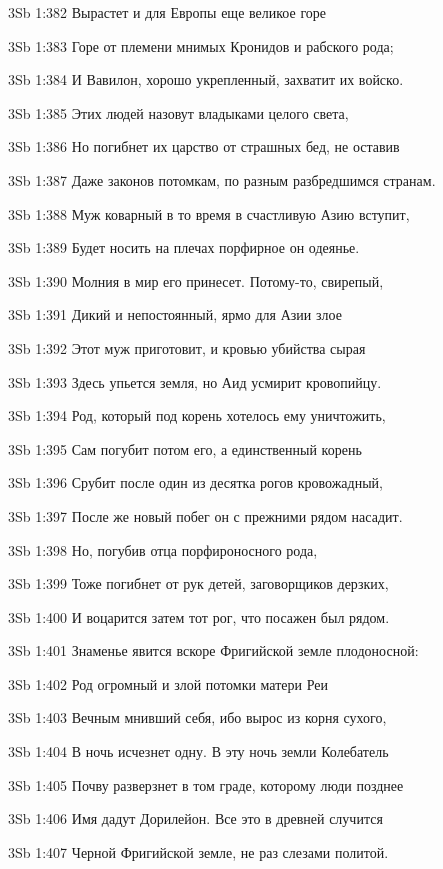 \vs 3Sb 1:382 Вырастет и для Европы еще великое горе  

\vs 3Sb 1:383 Горе от племени мнимых Кронидов и рабского рода; 

\vs 3Sb 1:384 И Вавилон, хорошо укрепленный, захватит их войско.

\vs 3Sb 1:385 Этих людей назовут владыками целого света,

\vs 3Sb 1:386 Но погибнет их царство от страшных бед, не оставив 

\vs 3Sb 1:387 Даже законов потомкам, по разным разбредшимся странам.

\vs 3Sb 1:388 Муж коварный в то время в счастливую Азию вступит, 

\vs 3Sb 1:389 Будет носить на плечах порфирное он одеянье.

\vs 3Sb 1:390 Молния в мир его принесет. Потому-то, свирепый, 

\vs 3Sb 1:391 Дикий и непостоянный, ярмо для Азии злое 

\vs 3Sb 1:392 Этот муж приготовит, и кровью убийства сырая 

\vs 3Sb 1:393 Здесь упьется земля, но Аид усмирит кровопийцу. 

\vs 3Sb 1:394 Род, который под корень хотелось ему уничтожить,

\vs 3Sb 1:395 Сам погубит потом его, а единственный корень  

\vs 3Sb 1:396 Срубит после один из десятка рогов кровожадный, 

\vs 3Sb 1:397 После же новый побег он с прежними рядом насадит. 

\vs 3Sb 1:398 Но, погубив отца порфироносного рода, 

\vs 3Sb 1:399 Тоже погибнет от рук детей, заговорщиков дерзких,

\vs 3Sb 1:400 И воцарится затем тот рог, что посажен был рядом.

\vs 3Sb 1:401 Знаменье явится вскоре Фригийской земле плодоносной: 

\vs 3Sb 1:402 Род огромный и злой  потомки матери Реи  

\vs 3Sb 1:403 Вечным мнивший себя, ибо вырос из корня сухого, 

\vs 3Sb 1:404 В ночь исчезнет одну. В эту ночь земли Колебатель

\vs 3Sb 1:405 Почву разверзнет в том граде, которому люди позднее 

\vs 3Sb 1:406 Имя дадут Дорилейон. Все это в древней случится 

\vs 3Sb 1:407 Черной Фригийской земле, не раз слезами политой. 

